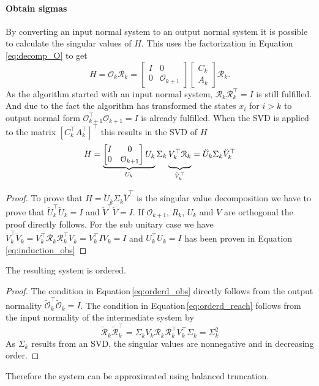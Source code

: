 \documentclass[numbers=noenddot,doctype=mastersthesis,BCOR=15mm,biblatex]{ldvbook}%
\newcommand{\R}{\mathcal{R}} %
\newcommand{\Ob}{\mathcal{O}} %
\newcommand{\eye}{I} %
\begin{document}
\paragraph{Obtain sigmas}
By converting an input normal system to an output normal system it is possible to calculate the singular values of $H$.
This uses the factorization in Equation\,\ref{eq:decomp_O}
to get
 \begin{equation}
 H = \Ob_k \R_k = 
 \begin{bmatrix}
 \eye& 0 \\
 0& \Ob_{k+1}
 \end{bmatrix}
 \begin{bmatrix}
 C_k\\
 A_k
 \end{bmatrix}
 \R_k
 .
 \end{equation}
As the algorithm started with an input normal system, $\R_k\R_k^\top = \eye$ is still fulfilled.
And due to the fact the algorithm has transformed the states $x_i$ for $i>k$ to output normal form $\Ob_{k+1}^\top \Ob_{k+1} = \eye$ is already fulfilled.
When the SVD is applied to the matrix $[C_k^\top A_k^\top]^\top$ this results in the SVD of $H$
 \begin{equation}
 H = 
 \underbrace{
 	\begin{bmatrix}
 	\eye& 0 \\
 	0& \Ob_{k+1}
 	\end{bmatrix}
 	U_k}_{U_k} 
 \Sigma_k 
 \underbrace{\vphantom{\begin{matrix} 0 \\0\end{matrix}}
 	V_k^\top
 	\R_k}_{\breve{V}_k^\top}
 =\breve{U}_k\Sigma_k \breve{V}_k^\top
 \end{equation}

 \begin{proof}
 	To prove that $H = \breve{U}_k\Sigma_k\breve{V}^\top$ is the singular value decomposition we have to prove that $\breve{U}_k^\top \breve{U}_k= \eye$ and $\breve{V}^\top \breve{V} = \eye$.
 	If $\Ob_{k+1}$, $R_k$, $U_k$ and $V$ are orthogonal the proof directly follows. For the sub unitary case we have 
 	$
 	\breve{V}_k^\top \breve{V}_k
 	=
 	V_k^\top
 	\R_k
 	\R_k^\top
 	V_k
 	=
 	V_k^\top
 	\eye
 	V_k
 	=
 	\eye
 	$
 	and
 	$
 	U_k^\top U_k
 	=
 	\eye 
 	$
 	has been proven in Equation\,\ref{eq:induction_obs}
 \end{proof}

The resulting system is ordered.
\begin{proof}
	The condition in Equation\,\ref{eq:orderd_obs} directly follows from the output normality $\tilde{\Ob}_k^\top \tilde{\Ob}_k = \eye$.
	The condition in Equation\,\ref{eq:orderd_reach} follows from the input normality of the intermediate system by
	\begin{equation}
		\tilde{\R}_k \tilde{\R}_k^\top 
		=
		\Sigma_k V_k \R_k \R_k^\top V_k^\top \Sigma_k 
		= \Sigma_k^2
	\end{equation}
	As $\Sigma_k$ results from an SVD, the singular values are nonnegative and in decreasing order. 
\end{proof}
Therefore the system can be approximated using balanced truncation.
\end{document}

